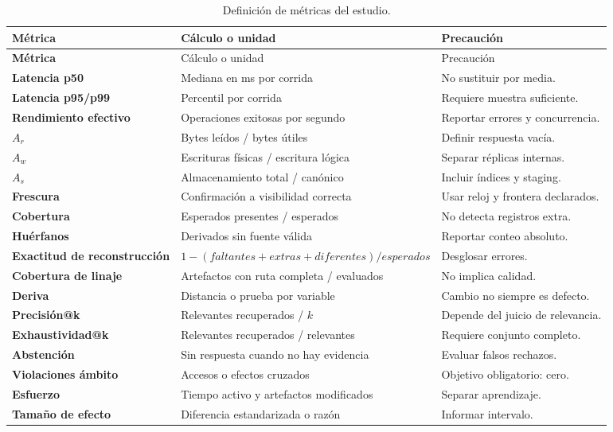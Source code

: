 \begin{longtable}{>{\bfseries}p{3.2cm}p{5.2cm}p{5.2cm}}
\caption{Definición de métricas del estudio.}\label{tab:diccionario-metricas}\\
\toprule
Métrica & Cálculo o unidad & Precaución \\
\midrule
\endfirsthead
\toprule
Métrica & Cálculo o unidad & Precaución \\
\midrule
\endhead
Latencia p50 & Mediana en ms por corrida & No sustituir por media.\\
Latencia p95/p99 & Percentil por corrida & Requiere muestra suficiente.\\
Rendimiento efectivo & Operaciones exitosas por segundo & Reportar errores y concurrencia.\\
$A_r$ & Bytes leídos / bytes útiles & Definir respuesta vacía.\\
$A_w$ & Escrituras físicas / escritura lógica & Separar réplicas internas.\\
$A_s$ & Almacenamiento total / canónico & Incluir índices y staging.\\
Frescura & Confirmación a visibilidad correcta & Usar reloj y frontera declarados.\\
Cobertura & Esperados presentes / esperados & No detecta registros extra.\\
Huérfanos & Derivados sin fuente válida & Reportar conteo absoluto.\\
Exactitud de reconstrucción & $1-(faltantes+extras+diferentes)/esperados$ & Desglosar errores.\\
Cobertura de linaje & Artefactos con ruta completa / evaluados & No implica calidad.\\
Deriva & Distancia o prueba por variable & Cambio no siempre es defecto.\\
Precisión@k & Relevantes recuperados / $k$ & Depende del juicio de relevancia.\\
Exhaustividad@k & Relevantes recuperados / relevantes & Requiere conjunto completo.\\
Abstención & Sin respuesta cuando no hay evidencia & Evaluar falsos rechazos.\\
Violaciones ámbito & Accesos o efectos cruzados & Objetivo obligatorio: cero.\\
Esfuerzo & Tiempo activo y artefactos modificados & Separar aprendizaje.\\
Tamaño de efecto & Diferencia estandarizada o razón & Informar intervalo.\\
\bottomrule
\end{longtable}

